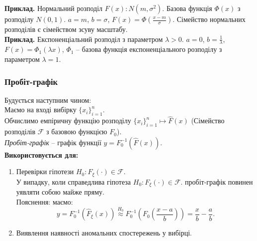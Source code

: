 \textbf{Приклад.} Нормальний розподіл $F(x): N(m, \sigma^2)$. Базова функція $\Phi(x)$ з розподілу $N(0,1)$. $a = m$, $b = \sigma$, $F(x) = \Phi\left(\frac{x - m}{\sigma}\right)$. Сімейство нормальних розподілів є сімейством зсуву масштабу. \\

\textbf{Приклад.} Експоненціальний розподіл з параметром $\lambda > 0$. $a = 0$, $b = \frac{1}{\lambda}$, $F(x) = \Phi_1(\lambda x)$, $\Phi_1$ -- базова функція експоненціального розподілу з параметром $\lambda = 1$. \\

\subsubsection{Пробіт-графік}
Будується наступним чином: \\

Маємо на вході вибірку $\{x_i\}_{i=1}^n$. \\

Обчислимо емпіричну функцію розподілу $\{x_i\}_{i=1}^n \mapsto \widehat{F}(x)$ (Сімейство розподілів $\mathcal{F}$ з базовою функцією $F_0$). \\

\textit{Пробіт-графік} -- графік функції $y = F_0^{-1}\left(\widehat{F}(x)\right)$. \\

\textbf{Використовується для:}
\begin{enumerate}
	\item Перевірки гіпотези $H_0: F_\xi(\cdot) \in \mathcal{F}$. \\

	У випадку, коли справедлива гіпотеза $H_0: F_\xi(\cdot) \in \mathcal{F}$. пробіт-графік повинен уявляти собою майже пряму. \\
	Пояснення: маємо: \[ y = F_0^{-1}(\widehat{F}_\xi(x)) \overset{H_0}{\approx} F_0^{-1}\left(F_0\left(\dfrac{x-a}{b}\right)\right) = \dfrac{x}{b} - \dfrac{a}{b}. \]
	\item Виявлення наявності аномальних спостережень у вибірці. %
\end{enumerate}